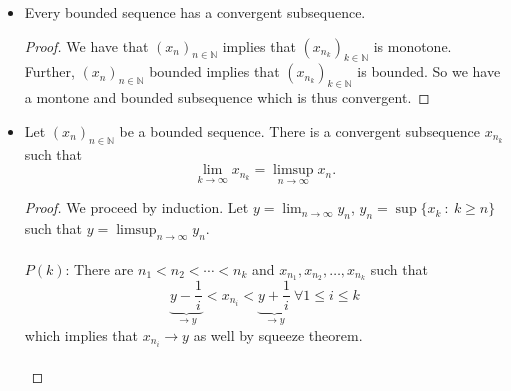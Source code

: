 \documentclass{article}
\newcommand{\N}{\mathbb{N}}
\newcommand{\seq}[2]{(#1_{#2})_{#2 \in \N}}
\newcommand{\?}{\stackrel{?}{=}}
\theoremstyle{definition} %
\begin{document}
\begin{itemize}
    \item[]
          \begin{theorem}
              Every bounded sequence has a convergent subsequence.
          \end{theorem}
          \begin{center}
          \end{center}
          \begin{proof}
              We have that $\seq{x}{n}$ implies that $(x_{n_k})_{k \in \N}$ is monotone. Further, $\seq{x}{n}$ bounded implies that $(x_{n_k})_{k \in \N}$ is bounded. So we have a montone and bounded subsequence which is thus convergent.
          \end{proof}
    \item[]
          \begin{lemma}
              Let $\seq{x}{n}$ be a bounded sequence. There is a convergent subsequence $x_{n_k}$ such that
              $$\lim_{k \to \infty} x_{n_k} = \limsup_{n \to \infty} x_n.$$
          \end{lemma}
          \begin{proof}
              We proceed by induction. Let $y = \lim_{n \to \infty} y_n$, $y_n = \sup\{x_k \ : \ k \geq n\}$ such that $y = \limsup_{n \to \infty} y_n$. \\\\
              $P(k)$: There are $n_1 < n_2 < \cdots < n_k$ and $x_{n_1}, x_{n_2}, \ldots, x_{n_k}$ such that
              $$\underbrace{y - \frac{1}{i}}_{\rightarrow y} < x_{n_i} < \underbrace{y + \frac{1}{i}}_{\rightarrow y} \ \forall 1 \leq i \leq k$$
              which implies that $x_{n_i} \rightarrow y$ as well by squeeze theorem. \\\\

\end{proof}
\end{itemize}
\end{document}
